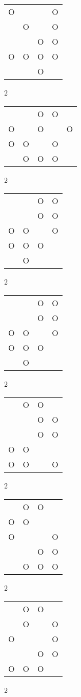 \begin{tabular}{|m{0.2cm}m{0.2cm}m{0.2cm}m{0.2cm}|}\hline
O& & &O\\
 &O& &O\\
 & &O&O\\
O&O&O&O\\
 & &O& \\
\hline\end{tabular}2
\begin{tabular}{|m{0.2cm}m{0.2cm}m{0.2cm}m{0.2cm}m{0.2cm}|}\hline
 & &O&O& \\
O& &O& &O\\
O&O& &O& \\
 &O&O&O& \\
\hline\end{tabular}2
\begin{tabular}{|m{0.2cm}m{0.2cm}m{0.2cm}m{0.2cm}|}\hline
 & &O&O\\
 & &O&O\\
O&O& &O\\
O&O&O& \\
 &O& & \\
\hline\end{tabular}2
\begin{tabular}{|m{0.2cm}m{0.2cm}m{0.2cm}m{0.2cm}|}\hline
 & &O&O\\
 & &O&O\\
O&O& &O\\
O&O&O& \\
 &O& & \\
\hline\end{tabular}2
\begin{tabular}{|m{0.2cm}m{0.2cm}m{0.2cm}m{0.2cm}|}\hline
 &O&O& \\
 & &O&O\\
 & &O&O\\
O&O& & \\
O&O& &O\\
\hline\end{tabular}2
\begin{tabular}{|m{0.2cm}m{0.2cm}m{0.2cm}m{0.2cm}|}\hline
 &O&O& \\
O&O& & \\
O& & &O\\
 & &O&O\\
 &O&O&O\\
\hline\end{tabular}2
\begin{tabular}{|m{0.2cm}m{0.2cm}m{0.2cm}m{0.2cm}|}\hline
 &O&O& \\
 &O& &O\\
O& & &O\\
 & &O&O\\
O&O&O& \\
\hline\end{tabular}2
